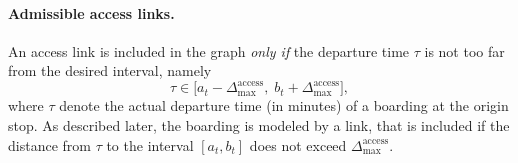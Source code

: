 \paragraph{Admissible access links.}
An access link is included in the graph \emph{only if} the departure time $\tau$ is not too far
from the desired interval, namely
\[
\tau \in \bigl[a_t-\Delta_{\max}^{\mathrm{access}},\; b_t+\Delta_{\max}^{\mathrm{access}}\bigr],
\]
where $\tau$ denote the actual departure time (in minutes) of a
boarding at the origin stop. As described later, the boarding is
modeled by a link, that is included if the distance from $\tau$ to the
interval $[a_t,b_t]$ does not exceed
$\Delta_{\max}^{\mathrm{access}}$.

